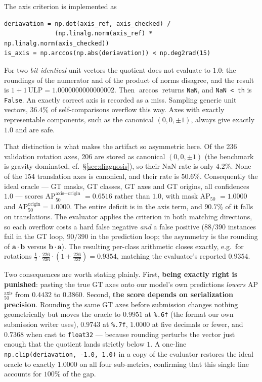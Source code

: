 \documentclass[11pt]{article}
\newcommand{\metric}{AP$_{50}^{\text{axis+origin}}$}
\newcommand{\apfifty}{AP$_{50}$}
\begin{document}
The axis criterion is implemented as
\begin{verbatim}
deriavation = np.dot(axis_ref, axis_checked) /
              (np.linalg.norm(axis_ref) * np.linalg.norm(axis_checked))
is_axis = np.arccos(np.abs(deriavation)) < np.deg2rad(15)
\end{verbatim}
For two \emph{bit-identical} unit vectors the quotient does not evaluate to
$1.0$: the roundings of the numerator and of the product of norms disagree,
and the result is $1{+}1\,\text{ULP} = 1.0000000000000002$. Then $\arccos$
returns \texttt{NaN}, and \texttt{NaN < th} is \texttt{False}. An exactly
correct axis is recorded as a miss. Sampling generic unit vectors, $36.4\%$
of self-comparisons overflow this way. Axes with exactly representable
components, such as the canonical $(0,0,\pm 1)$, always give exactly $1.0$
and are safe.

That distinction is what makes the artifact so asymmetric here. Of the 236
validation rotation axes, 206 are stored as canonical $(0,0,\pm 1)$ (the
benchmark is gravity-dominated, cf.\ \S\ref{sec:diagnosis}), so their NaN
rate is only $4.2\%$. None of the 154 translation axes is canonical, and
their rate is $50.6\%$. Consequently the ideal oracle --- GT masks, GT
classes, GT axes and GT origins, all confidences $1.0$ --- scores
\metric{} $=0.6516$ rather than $1.0$, with mask \apfifty{} $=1.0000$ and
AP$_{50}^{\text{origin}} =1.0000$. The entire deficit is in the axis term,
and $90.7\%$ of it falls on translations. The evaluator applies the
criterion in both matching directions, so each overflow costs a hard false
negative \emph{and} a false positive ($88/390$ instances fail in the GT
loop, $90/390$ in the prediction loop; the asymmetry is the rounding of
$\mathbf{a}\!\cdot\!\mathbf{b}$ versus $\mathbf{b}\!\cdot\!\mathbf{a}$). The
resulting per-class arithmetic closes exactly, e.g.\ for rotations
$\tfrac{1}{2}\cdot\tfrac{226}{236}\cdot(1+\tfrac{226}{237}) = 0.9354$,
matching the evaluator's reported $0.9354$.

Two consequences are worth stating plainly. First, \textbf{being exactly
right is punished}: pasting the true GT axes onto our model's own
predictions \emph{lowers} AP$_{50}^{\text{axis}}$ from $0.4432$ to $0.3860$.
Second, \textbf{the score depends on serialization precision}. Rounding the
same GT axes before submission changes nothing geometrically but moves the
oracle to $0.9951$ at \texttt{\%.6f} (the format our own submission writer
uses), $0.9743$ at \texttt{\%.7f}, $1.0000$ at five decimals or fewer, and
$0.7368$ when cast to \texttt{float32} --- because rounding perturbs the
vector just enough that the quotient lands strictly below $1$. A one-line
\texttt{np.clip(deriavation, -1.0, 1.0)} in a copy of the evaluator restores
the ideal oracle to exactly $1.0000$ on all four sub-metrics, confirming
that this single line accounts for $100\%$ of the gap.
\end{document}
